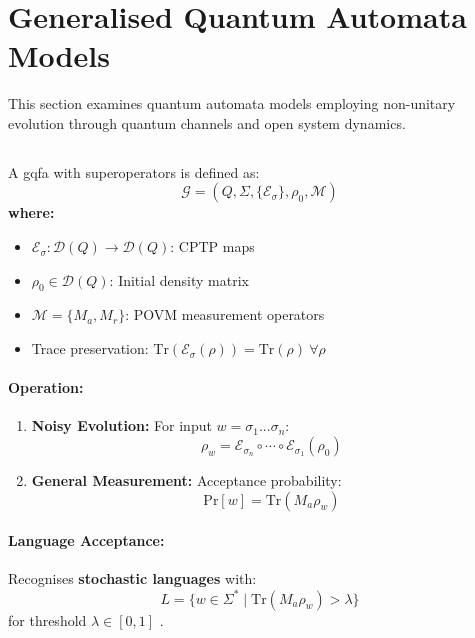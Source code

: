 \section{Generalised Quantum Automata Models}
\label{sec:gqfa}

This section examines quantum automata models employing non-unitary evolution through quantum channels and open system dynamics.

\subsection{}
\label{subsec:gqfa}

\begin{definition}
A \gls{gqfa} with superoperators is defined as:
\[
\mathcal{G} = (Q, \Sigma, \{\mathcal{E}_\sigma\}, \rho_0, \mathcal{M})
\]
\textbf{where:}
\begin{itemize}
    \item $\mathcal{E}_\sigma: \mathcal{D}(Q) \rightarrow \mathcal{D}(Q)$: CPTP maps
    \item $\rho_0 \in \mathcal{D}(Q)$: Initial density matrix
    \item $\mathcal{M} = \{M_a, M_r\}$: POVM measurement operators
    \item Trace preservation: $\text{Tr}(\mathcal{E}_\sigma(\rho)) = \text{Tr}(\rho)\ \forall\rho$
\end{itemize}
\end{definition}

\paragraph{Operation:}
\begin{enumerate}
    \item \textbf{Noisy Evolution:} For input $w = \sigma_1...\sigma_n$:
    \[
    \rho_w = \mathcal{E}_{\sigma_n} \circ \cdots \circ \mathcal{E}_{\sigma_1} (\rho_0)
    \]
    \item \textbf{General Measurement:} Acceptance probability:
    \[
    \text{Pr}[w] = \text{Tr}(M_a \rho_w)
    \]
\end{enumerate}

\paragraph{Language Acceptance:}
Recognises \textbf{stochastic languages} with:
\[
L = \{w \in \Sigma^* \mid \text{Tr}(M_a \rho_w) > \lambda\}
\]
for threshold $\lambda \in [0,1]$ \cite{hirvensalo2012quantum}.

